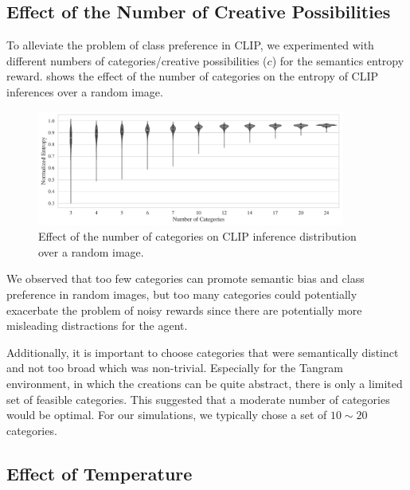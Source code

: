 
\subsection{Effect of the Number of Creative Possibilities}
\label{sec:clip-categories}
To alleviate the problem of class preference in CLIP, we experimented with different numbers of categories/creative possibilities (\(c\)) for the semantics entropy reward.
 shows the effect of the number of categories on the entropy of CLIP inferences over a random image.

\begin{figure}[H]
    \centering
    \includegraphics[width=0.9\textwidth]{images/category_comparison_tangram.pdf}
    \caption{Effect of the number of categories on CLIP inference distribution over a random image.}
    \label{fig:clip-categories}
\end{figure}
\vspace{-7pt}
We observed that too few categories can promote semantic bias and class preference in random images, but too many categories could potentially exacerbate the problem of noisy rewards since there are potentially more misleading distractions for the agent.

Additionally, it is important to choose categories that were semantically distinct and not too broad which was non-trivial.
Especially for the Tangram environment, in which the creations can be quite abstract, there is only a limited set of feasible categories.
This suggested that a moderate number of categories would be optimal.
For our simulations, we typically chose a set of \(10 \sim 20\) categories.

\subsection{Effect of Temperature}
\label{sec:reg-temperature}


